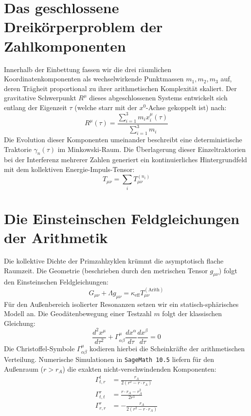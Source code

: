\documentclass[11pt,a4paper,nofootinbib]{article}
\begin{document}
	\section{Das geschlossene Dreikörperproblem der Zahlkomponenten}
	Innerhalb der Einbettung fassen wir die drei räumlichen Koordinatenkomponenten als wechselwirkende Punktmassen $m_1, m_2, m_3$ auf, deren Trägheit proportional zu ihrer arithmetischen Komplexität skaliert. Der gravitative Schwerpunkt $R^\mu$ dieses abgeschlossenen Systems entwickelt sich entlang der Eigenzeit $\tau$ (welche starr mit der $x^0$-Achse gekoppelt ist) nach:
	\begin{equation}
		R^\mu(\tau) = \frac{\sum_{i=1}^3 m_i x_i^\mu(\tau)}{\sum_{i=1}^3 m_i}
	\end{equation}
	Die Evolution dieser Komponenten umeinander beschreibt eine deterministische Traktorie $\gamma_n(\tau)$ im Minkowski-Raum. Die Überlagerung dieser Einzeltraktorien bei der Interferenz mehrerer Zahlen generiert ein kontinuierliches Hintergrundfeld mit dem kollektiven Energie-Impuls-Tensor:
	\begin{equation}
		T_{\mu\nu} = \sum_{i} T_{\mu\nu}^{(n_i)}
	\end{equation}
	
	\section{Die Einsteinschen Feldgleichungen der Arithmetik}
	Die kollektive Dichte der Primzahlzyklen krümmt die asymptotisch flache Raumzeit. Die Geometrie (beschrieben durch den metrischen Tensor $g_{\mu\nu}$) folgt den Einsteinschen Feldgleichungen:
	\begin{equation}
		G_{\mu\nu} + \Lambda g_{\mu\nu} = \kappa_{\text{eff}} T_{\mu\nu}^{(\text{Arith})}
	\end{equation}
	Für den Außenbereich isolierter Resonanzen setzen wir ein statisch-sphärisches Modell an. Die Geodätenbewegung einer Testzahl $m$ folgt der klassischen Gleichung:
	\begin{equation}
		\frac{d^2 x^\mu}{d\tau^2} + \Gamma^\mu_{\alpha\beta} \frac{dx^\alpha}{d\tau} \frac{dx^\beta}{d\tau} = 0
	\end{equation}
	Die Christoffel-Symbole $\Gamma^\mu_{\alpha\beta}$ kodieren hierbei die Scheinkräfte der arithmetischen Verteilung. Numerische Simulationen in \texttt{SageMath 10.5} liefern für den Außenraum ($r > r_A$) die exakten nicht-verschwindenden Komponenten:
	\begin{align}
		\Gamma^t_{t,r} &= \frac{r_A}{2(r^2 - r \cdot r_A)} \\
		\Gamma^r_{t,t} &= \frac{r \cdot r_A - r_A^2}{2r^3} \\
		\Gamma^r_{r,r} &= -\frac{r_A}{2(r^2 - r \cdot r_A)}
	\end{align}
	
\end{document}
